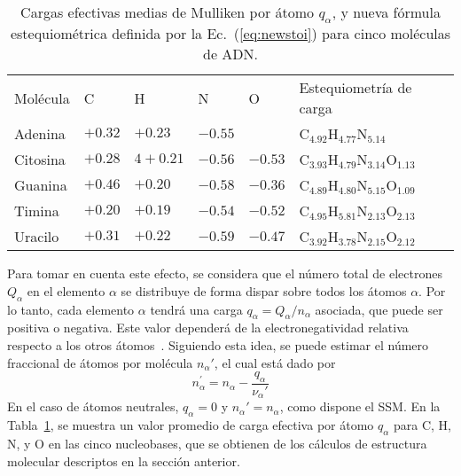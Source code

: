 \begin{table}
\begin{center}
\begin{tabularx}{\textwidth}{
>{\centering\arraybackslash}p{}
>{\centering\arraybackslash}p{}
>{\centering\arraybackslash}p{}
>{\centering\arraybackslash}p{}
>{\centering\arraybackslash}p{}
>{\centering\arraybackslash}p{}}
\rowcolor{mydarkgray} 
Molécula & C & H & N & O & Estequiometría de carga \\
Adenina & $+0.32$ & $+0.23$ & $-0.55$ &       & 
C$_{4.92}$H$_{4.77}$N$_{5.14}$ \\ 
\rowcolor{mygray} 
Citosina & $+0.28$ & $4+0.21$ & $-0.56$ & $-0.53$ & 
C$_{3.93}$H$_{4.79}$N$_{3.14}$O$_{1.13}$ \\ 
Guanina & $+0.46$ & $+0.20$ & $-0.58$ & $-0.36$ & 
C$_{4.89}$H$_{4.80}$N$_{5.15}$O$_{1.09}$ \\ 
\rowcolor{mygray} 
Timina & $+0.20$ & $+0.19$ & $-0.54$ & $-0.52$ & 
C$_{4.95}$H$_{5.81}$N$_{2.13}$O$_{2.13}$ \\ 
Uracilo & $+0.31$ & $+0.22$ & $-0.59$ & $-0.47$ & 
C$_{3.92}$H$_{3.78}$N$_{2.15}$O$_{2.12}$ \\ 
\end{tabularx}
\caption[Cargas efectivas medias de Mulliken por átomo]
{Cargas efectivas medias de Mulliken por átomo $q_{\alpha}$, y nueva 
fórmula estequiométrica definida por la Ec.~(\ref{eq:newstoi}) para 
cinco moléculas de ADN.}
\label{tab:newstoi}
\end{center}
\end{table}

Para tomar en cuenta este efecto, se considera que el número total 
de electrones $Q_{\alpha }$ en el elemento $\alpha$ se distribuye de 
forma dispar sobre todos los átomos $\alpha$. Por lo tanto, cada 
elemento $\alpha$ tendrá una carga $q_{\alpha}=Q_{\alpha}/n_{\alpha}$ 
asociada, que puede ser positiva o negativa. Este valor dependerá de la 
electronegatividad relativa respecto a los otros 
átomos~\cite{rappe1991}. 
Siguiendo esta idea, se puede estimar el número fraccional de átomos por 
molécula $n_{\alpha}'$, el cual está dado por 
\begin{equation}
n_{\alpha }^{\prime }=n_{\alpha }-\frac{q_{\alpha }}{\nu_{\alpha }'}
\label{eq:newstoi}
\end{equation}
En el caso de átomos neutrales, $q_{\alpha}=0$ y 
$n_{\alpha}'=n_{\alpha}$, como dispone el SSM. En la 
Tabla~\ref{tab:newstoi}, se muestra un valor promedio de carga efectiva 
por átomo $q_{\alpha}$ para C, H, N, y O en las cinco nucleobases, que 
se obtienen de los cálculos de estructura molecular descriptos 
en la sección anterior.


